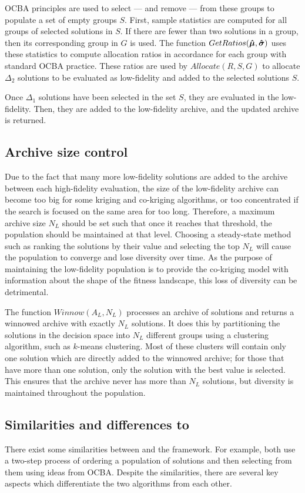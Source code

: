 OCBA principles are used to select --- and remove --- from these groups to populate a set of empty groups $S$. First, sample statistics are computed for all groups of selected solutions in $S$. If there are fewer than two solutions in a group, then its corresponding group in $G$ is used. The function $GetRatios(\boldsymbol{\hat{\mu}},\boldsymbol{\hat{\sigma}})$ uses these statistics to compute allocation ratios in accordance for each group with standard OCBA practice. These ratios are used by $Allocate(R,S,G)$ to allocate $\Delta_2$ solutions to be evaluated as low-fidelity and added to the selected solutions $S$.

Once $\Delta_1$ solutions have been selected in the set $S$, they are evaluated in the low-fidelity. Then, they are added to the low-fidelity archive, and the updated archive is returned.

\subsection{Archive size control}
Due to the fact that many more low-fidelity solutions are added to the archive between each high-fidelity evaluation, the size of the low-fidelity archive can become too big for some kriging and co-kriging algorithms, or too concentrated if the search is focused on the same area for too long. Therefore, a maximum archive size $N_L$ should be set such that once it reaches that threshold, the population should be maintained at that level. Choosing a steady-state method such as ranking the solutions by their value and selecting the top $N_L$ will cause the population to converge and lose diversity over time. As the purpose of maintaining the low-fidelity population is to provide the co-kriging model with information about the shape of the fitness landscape, this loss of diversity can be detrimental. 

The function $Winnow(A_L,N_L)$ processes an archive of solutions and returns a winnowed archive with exactly $N_L$ solutions. It does this by partitioning the solutions in the decision space into $N_L$ different groups using a clustering algorithm, such as $k$-means clustering. Most of these clusters will contain only one solution which are directly added to the winnowed archive; for those that have more than one solution, only the solution with the best value is selected. This ensures that the archive never has more than $N_L$ solutions, but diversity is maintained throughout the population.

\subsection{Similarities and differences to \motos{}}
There exist some similarities between \AlgName{} and the \motos{} framework. For example, both use a two-step process of ordering a population of solutions and then selecting from them using ideas from OCBA. Despite the similarities, there are several key aspects which differentiate the two algorithms from each other. 

